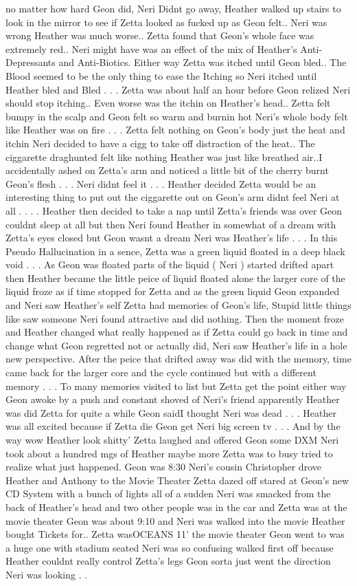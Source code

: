 \documentclass[12pt]{book}
\begin{document}
no matter how hard Geon did, Neri Didnt go away, Heather walked up stairs to look in the mirror to see if Zetta looked as fucked up as Geon felt.. Neri was wrong Heather was much worse.. Zetta found that Geon's whole face was extremely red.. Neri might have was an effect of the mix of Heather's Anti-Depressants and Anti-Biotics. Either way Zetta was itched until Geon bled.. The Blood seemed to be the only thing to ease the Itching so Neri itched until Heather bled and Bled . . .  Zetta was about half an hour before Geon relized Neri should stop itching.. Even worse was the itchin on Heather's head.. Zetta felt bumpy in the scalp and Geon felt so warm and burnin hot Neri's whole body felt like Heather was on fire . . .  Zetta felt nothing on Geon's body just the heat and itchin Neri decided to have a cigg to take off distraction of the heat.. The ciggarette draghunted felt like nothing Heather was just like breathed air..I accidentally ashed on Zetta's arm and noticed a little bit of the cherry burnt Geon's flesh  . . .  Neri didnt feel it . . .  Heather decided Zetta would be an interesting thing to put out the ciggarette out on Geon's arm didnt feel Neri at all . . .  . Heather then decided to take a nap until Zetta's friends was over Geon couldnt sleep at all but then Neri found Heather in somewhat of a dream with Zetta's eyes closed but Geon wasnt a dream Neri was Heather's life . . .  In this Pseudo Hallucination in a sence, Zetta was a green liquid floated in a deep black void . . .  As Geon was floated parts of the liquid ( Neri ) started drifted apart then Heather became the little peice of liquid floated alone the larger core of the liquid froze as if time stopped for Zetta and as the green liquid Geon expanded and Neri saw Heather's self Zetta had memories of Geon's life, Stupid little things like saw someone Neri found attractive and did nothing. Then the moment froze and Heather changed what really happened as if Zetta could go back in time and change what Geon regretted not or actually did, Neri saw Heather's life in a hole new perspective. After the peice that drifted away was did with the memory, time came back for the larger core and the cycle continued but with a different memory . . .  To many memories visited to list but Zetta get the point either way Geon awoke by a push and constant shoved of Neri's friend apparently Heather was did Zetta for quite a while Geon saidI thought Neri was dead . . .  Heather was all excited because if Zetta die Geon get Neri big screen tv . . .  And by the way wow Heather look shitty' Zetta laughed and offered Geon some DXM Neri took about a hundred mgs of Heather maybe more Zetta was to busy tried to realize what just happened. Geon was 8:30 Neri's cousin Christopher drove Heather and Anthony to the Movie Theater Zetta dazed off stared at Geon's new CD System with a bunch of lights all of a sudden Neri was smacked from the back of Heather's head and two other people was in the car and Zetta was at the movie theater Geon was about 9:10 and Neri was walked into the movie Heather bought Tickets for.. Zetta wasOCEANS 11' the movie theater Geon went to was a huge one with stadium seated Neri was so confusing walked first off because Heather couldnt really control Zetta's legs Geon sorta just went the direction Neri was looking . . 
\end{document}
